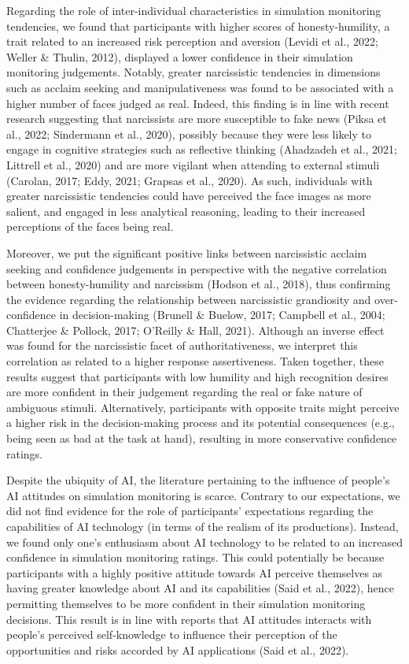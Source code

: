 \documentclass[
  man,floatsintext]{apa6}
\begin{document}
Regarding the role of inter-individual characteristics in simulation monitoring tendencies, we found that participants with higher scores of honesty-humility, a trait related to an increased risk perception and aversion (Levidi et al., 2022; Weller \& Thulin, 2012), displayed a lower confidence in their simulation monitoring judgements. Notably, greater narcissistic tendencies in dimensions such as acclaim seeking and manipulativeness was found to be associated with a higher number of faces judged as real. Indeed, this finding is in line with recent research suggesting that narcissists are more susceptible to fake news (Piksa et al., 2022; Sindermann et al., 2020), possibly because they were less likely to engage in cognitive strategies such as reflective thinking (Ahadzadeh et al., 2021; Littrell et al., 2020) and are more vigilant when attending to external stimuli (Carolan, 2017; Eddy, 2021; Grapsas et al., 2020). As such, individuals with greater narcissistic tendencies could have perceived the face images as more salient, and engaged in less analytical reasoning, leading to their increased perceptions of the faces being real.

Moreover, we put the significant positive links between narcissistic acclaim seeking and confidence judgements in perspective with the negative correlation between honesty-humility and narcissism (Hodson et al., 2018), thus confirming the evidence regarding the relationship between narcissistic grandiosity and over-confidence in decision-making (Brunell \& Buelow, 2017; Campbell et al., 2004; Chatterjee \& Pollock, 2017; O'Reilly \& Hall, 2021). Although an inverse effect was found for the narcissistic facet of authoritativeness, we interpret this correlation as related to a higher response assertiveness. Taken together, these results suggest that participants with low humility and high recognition desires are more confident in their judgement regarding the real or fake nature of ambiguous stimuli. Alternatively, participants with opposite traits might perceive a higher risk in the decision-making process and its potential consequences (e.g., being seen as bad at the task at hand), resulting in more conservative confidence ratings.

Despite the ubiquity of AI, the literature pertaining to the influence of people's AI attitudes on simulation monitoring is scarce. Contrary to our expectations, we did not find evidence for the role of participants' expectations regarding the capabilities of AI technology (in terms of the realism of its productions). Instead, we found only one's enthusiasm about AI technology to be related to an increased confidence in simulation monitoring ratings. This could potentially be because participants with a highly positive attitude towards AI perceive themselves as having greater knowledge about AI and its capabilities (Said et al., 2022), hence permitting themselves to be more confident in their simulation monitoring decisions. This result is in line with reports that AI attitudes interacts with people's perceived self-knowledge to influence their perception of the opportunities and risks accorded by AI applications (Said et al., 2022).
\end{document}
